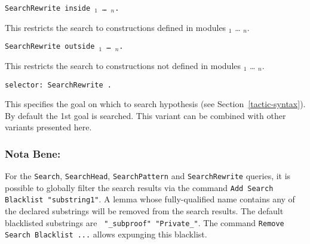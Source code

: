 \begin{Variants}
\item {\tt SearchRewrite {\term} inside
{\module$_1$} \ldots{} {\module$_n$}.}

This restricts the search to constructions defined in modules
{\module$_1$} \ldots{} {\module$_n$}.

\item {\tt SearchRewrite {\term} outside {\module$_1$} \ldots{} {\module$_n$}.}

This restricts the search to constructions not defined in modules
{\module$_1$} \ldots{} {\module$_n$}.

\item {\tt selector: SearchRewrite {\term}.}

  This specifies the goal on which to search hypothesis (see
  Section~\ref{tactic-syntax}). By default the 1st goal is searched.
  This variant can be combined with other variants presented here.

\end{Variants}

\subsubsection{Nota Bene:}
For the {\tt Search}, {\tt SearchHead}, {\tt SearchPattern} and
{\tt SearchRewrite} queries, it is possible to globally filter
the search results via the command
{\tt Add Search Blacklist "substring1"}.
A lemma whose fully-qualified name contains any of the declared substrings
will be removed from the search results.
The default blacklisted substrings are {\tt
  "\_subproof" "Private\_"}. The command {\tt Remove Search Blacklist
  ...} allows expunging this blacklist.


